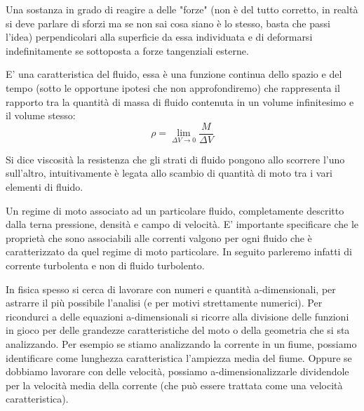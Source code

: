 \begin{defn}[Fluido]
	Una sostanza in grado di reagire a delle "forze" (non è del tutto corretto, in realtà si deve parlare di sforzi ma se non sai cosa siano è lo stesso, basta che passi l'idea) perpendicolari alla superficie da essa individuata e di deformarsi indefinitamente se sottoposta a forze tangenziali esterne.
\end{defn}

\begin{defn}[Densità]
	E' una caratteristica del fluido, essa è una funzione continua dello spazio e del tempo (sotto le opportune ipotesi che non approfondiremo) che rappresenta il rapporto tra la quantità di massa di fluido contenuta in un volume infinitesimo e il volume stesso:
	\[\rho=\lim_{\Delta V\to 0}\frac{M}{\Delta V} \]
\end{defn}
 
\begin{defn}[Viscosità]
	Si dice viscosità la resistenza che gli strati di fluido pongono allo scorrere l'uno sull'altro, intuitivamente è legata allo scambio di quantità di moto tra i vari elementi di fluido.
\end{defn}

\begin{defn}[Corrente]
	Un regime di moto associato ad un particolare fluido, completamente descritto dalla terna pressione, densità e campo di velocità. E' importante specificare che le proprietà che sono associabili alle correnti valgono per ogni fluido che è caratterizzato da quel regime di moto particolare. In seguito parleremo infatti di corrente turbolenta e non di fluido turbolento.
\end{defn}
 
\begin{defn}
	In fisica spesso si cerca di lavorare con numeri e quantità a-dimensionali, per astrarre il più possibile l'analisi (e per motivi strettamente numerici). Per ricondurci a delle equazioni a-dimensionali si ricorre alla divisione delle funzioni in gioco per delle grandezze caratteristiche del moto o della geometria che si sta analizzando. Per esempio se stiamo analizzando la corrente in un fiume, possiamo identificare come lunghezza caratteristica l'ampiezza media del fiume. Oppure se dobbiamo lavorare con delle velocità, possiamo a-dimensionalizzarle dividendole per la velocità media della corrente (che può essere trattata come una velocità caratteristica).
\end{defn} 

